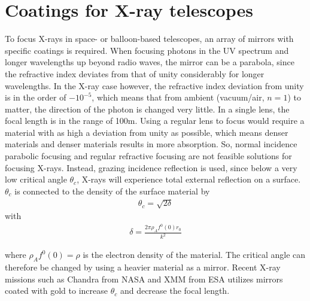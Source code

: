 \section{Coatings for X-ray telescopes}
To focus X-rays in space- or balloon-based telescopes, an array of mirrors with specific coatings is required. When focusing photons in the UV spectrum and longer wavelengths up beyond radio waves, the mirror can be a parabola, since the refractive index deviates from that of unity considerably for longer wavelengths. In the X-ray case however, the refractive index deviation from unity is in the order of $-10^{-5}$, which means that from ambient (vacuum/air, $n=1$) to matter, the direction of the photon is changed very little. In a single lens, the focal length is in the range of 100m. Using a regular lens to focus would require a material with as high a deviation from unity as possible, which means denser materials and denser materials results in more absorption. So, normal incidence parabolic focusing and regular refractive focusing are not feasible solutions for focusing X-rays. Instead, grazing incidence reflection is used, since below a very low critical angle $\theta_c$, X-rays will experience total external reflection on a surface\cite{AlsNielsen:2001vt}. $\theta_c$ is connected to the density of the surface material by
\begin{eqnarray}
	\theta_c = \sqrt{2\delta}
\end{eqnarray}
with
\begin{eqnarray}
	\delta = \frac{2\pi \rho_A f^0 (0) r_0}{k^2}
\end{eqnarray}

where $\rho_A f^0 (0)=\rho$ is the electron density of the material. The critical angle can therefore be changed by using a heavier material as a mirror. Recent X-ray missions such as Chandra from NASA and XMM from ESA utilizes mirrors coated with gold to increase $\theta_c$ and decrease the focal length.

